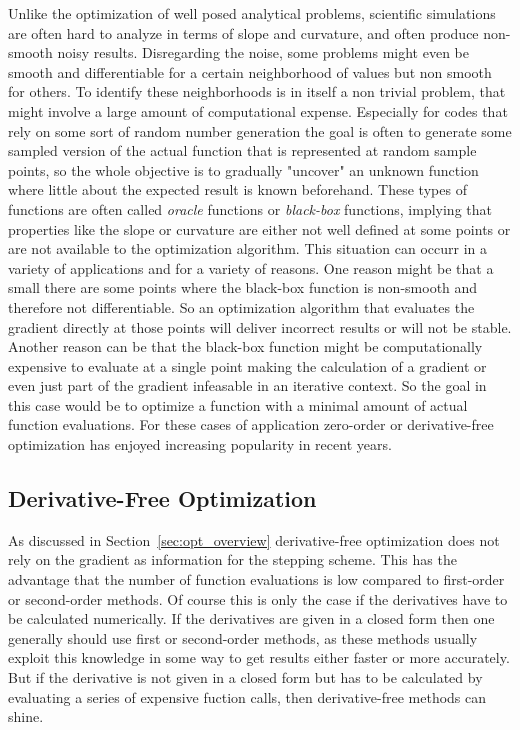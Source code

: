 \documentclass[a4paper,10pt]{article}
\newcommand{\secref}[1]{Section~\ref{#1}}
\begin{document}
    Unlike the optimization of well posed analytical problems, scientific
    simulations are often hard to analyze in terms of slope and 
    curvature, and often produce non-smooth noisy results.
    Disregarding the noise, some problems might even be smooth and
    differentiable for a certain neighborhood of values but non smooth
    for others.
    To identify these neighborhoods is in itself a non trivial problem,
    that might involve a large amount of computational expense.
    Especially for codes that rely on some sort of random number generation
    the goal is often to generate some sampled version of the actual function
    that is represented at random sample points, so the whole
    objective is to gradually "uncover" an unknown function where
    little about the expected result is known beforehand.
    These types of functions are often called \emph{oracle} functions
    or \emph{black-box} functions, implying that properties like
    the slope or curvature are either not well defined at some points
    or are not available to the optimization algorithm.
    This situation can occurr in a variety of applications and
    for a variety of reasons.
    One reason might be that a small there are some points where the
    black-box function is non-smooth and therefore not differentiable.
    So an optimization algorithm that evaluates the gradient directly
    at those points will deliver incorrect results or will
    not be stable.
    Another reason can be that the black-box function might be
    computationally expensive to evaluate at a single point making
    the calculation of a gradient or even just part of the gradient
    infeasable in an iterative context.
    So the goal in this case would be to optimize a function with
    a minimal amount of actual function evaluations.
    For these cases of application zero-order or derivative-free 
    optimization has enjoyed increasing popularity in recent years.

    \subsection{Derivative-Free Optimization}

    As discussed in \secref{sec:opt_overview} derivative-free 
    optimization does not rely on the gradient as information for
    the stepping scheme.
    This has the advantage that the number of function evaluations
    is low compared to first-order or second-order methods.
    Of course this is only the case if the derivatives have to be
    calculated numerically.
    If the derivatives are given in a closed form then one generally
    should use first or second-order methods, as these methods
    usually exploit this knowledge in some way to get results
    either faster or more accurately.
    But if the derivative is not given in a closed form but has to be
    calculated by evaluating a series of expensive fuction calls, then
    derivative-free methods can shine.
\end{document}
